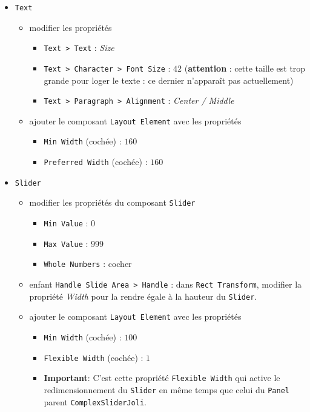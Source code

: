 \documentclass[a4paper,10pt]{article}
\newenvironment{solution}%
{\begin{tcolorbox}[breakable,colback=red!5!white,colframe=red!75!black,title=Solution]}%
{\end{tcolorbox}}
\begin{document}
\begin{solution}
\begin{itemize} 
\item \texttt{Text}
	\begin{itemize} 	
		\item modifier les propriétés
		\begin{itemize} 	
			\item \texttt{Text > Text} : \textit{Size}
			\item \texttt{Text > Character > Font Size} : $42$ (\textbf{attention} : cette taille est trop grande pour loger le texte : ce dernier n'apparaît pas actuellement)
			\item \texttt{Text > Paragraph > Alignment} : \textit{Center / Middle}
		\end{itemize}	
		\item ajouter le composant \texttt{Layout Element} avec les propriétés
		\begin{itemize} 	
			\item \texttt{Min Width} (cochée) : $160$
			\item \texttt{Preferred Width} (cochée) : $160$
		\end{itemize}	
	\end{itemize}
\item \texttt{Slider}
\begin{itemize} 	
	\item modifier les propriétés du composant \texttt{Slider}
	\begin{itemize}
		\item \texttt{Min Value} : $0$
		\item \texttt{Max Value} : $999$
		\item \texttt{Whole Numbers} : cocher
	\end{itemize}			
	\item enfant \texttt{Handle Slide Area > Handle} : dans \texttt{Rect Transform}, modifier la propriété \textit{Width} pour la rendre égale à la hauteur  du \texttt{Slider}.
	\item ajouter le composant \texttt{Layout Element} avec les propriétés
	\begin{itemize}
		\item \texttt{Min Width} (cochée) : $100$
		\item \texttt{Flexible Width} (cochée) : $1$
		\item \textbf{Important}: C'est cette propriété \texttt{Flexible Width} qui active le redimensionnement du \texttt{Slider} en même temps que celui du \texttt{Panel} parent \texttt{ComplexSliderJoli}. 
	\end{itemize}	

\end{itemize}
\end{itemize}
\end{solution}
\end{document}
